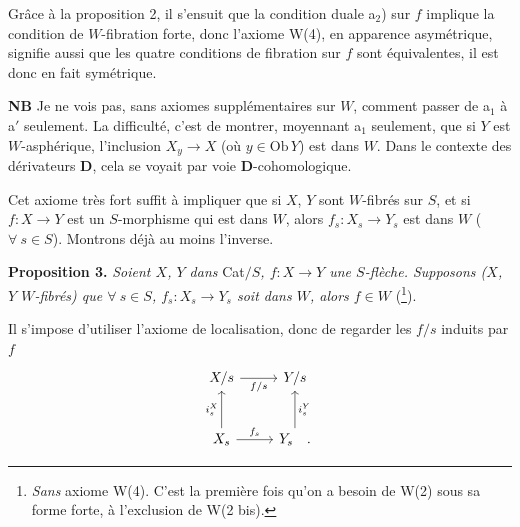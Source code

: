 Grâce à la proposition 2, il s'ensuit que la condition duale a$_2$) sur $f$ implique la condition de $W$-fibration forte, donc l'axiome W(4), en apparence asymétrique, signifie aussi que les quatre conditions de fibration sur $f$ sont équivalentes, il est donc en fait symétrique.

\textbf{NB} Je ne vois pas, sans axiomes supplémentaires sur $W$, comment passer de a$_1$ à a$'$ seulement. La difficulté, c'est de montrer, moyennant a$_1$ seulement, que si $Y$ est $W$-asphérique, l'inclusion $X_y \longrightarrow X$ (où $y \in \mathrm{Ob}\,Y$) est dans $W$. Dans le contexte des dérivateurs \textbf{D}, cela se voyait par voie \textbf{D}-cohomologique.

Cet axiome très fort suffit à impliquer que si $X$, $Y$ sont $W$-fibrés sur $S$, et si $f : X \longrightarrow Y$ est un $S$-morphisme qui est dans $W$, alors $f_s : X_s \longrightarrow Y_s$ est dans $W$ ($\forall\ s \in S$). Montrons déjà au moins l'inverse.


\textbf{Proposition 3.} \textit{Soient $X$, $Y$ dans} Cat$/S$\textit{, $f : X \longrightarrow Y$ une $S$-flèche. Supposons ($X$, $Y$ $W$-fibrés) que $\forall\ s \in S$, $f_s : X_s \longrightarrow Y_s$ soit dans $W$, alors $f \in W$} (\footnote[8]{\textit{Sans} axiome W(4). C'est la première fois qu'on a besoin de W(2) sous sa forme forte, à l'exclusion de W(2 bis).}).

Il s'impose d'utiliser l'axiome de localisation, donc de regarder les $f/s$ induits par $f$
\[
\begin{tikzcd}[row sep=large]
X/s \arrow[r, "f/s"'] & Y/s \\
X_s \arrow[u, "i_s^X"] \arrow[r, "f_s"] & Y_s \arrow[u, "i_s^Y"'] \quad .
\end{tikzcd}
\]


